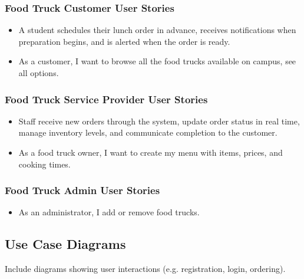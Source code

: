 \documentclass[12pt,a4paper]{article}
\begin{document}
\begin{itemize}[leftmargin=2em, itemsep=6pt]
\subsubsection{Food Truck Customer User Stories}
\begin{storybox}
\begin{itemize}[leftmargin=1em, itemsep=6pt]
    \item A student schedules their lunch order in advance, receives notifications when preparation begins, and is alerted when the order is ready.
    \item As a customer, I want to browse all the food trucks available on campus, see all options.
\end{itemize}
\end{storybox}

\vspace{1em}

\subsubsection{Food Truck Service Provider User Stories}
\begin{storybox}
\begin{itemize}[leftmargin=1em, itemsep=6pt]
    \item Staff receive new orders through the system, update order status in real time, manage inventory levels, and communicate completion to the customer.
    \item As a food truck owner, I want to create my menu with items, prices, and cooking times.
\end{itemize}
\end{storybox}

\vspace{1em}

\subsubsection{Food Truck Admin User Stories}
\begin{storybox}
\begin{itemize}[leftmargin=1em, itemsep=6pt]
    \item As an administrator, I add or remove food trucks.
\end{itemize}
\end{storybox}

\subsection{Use Case Diagrams}
Include diagrams showing user interactions (e.g. registration, login, ordering).


\end{itemize}
\end{document}
